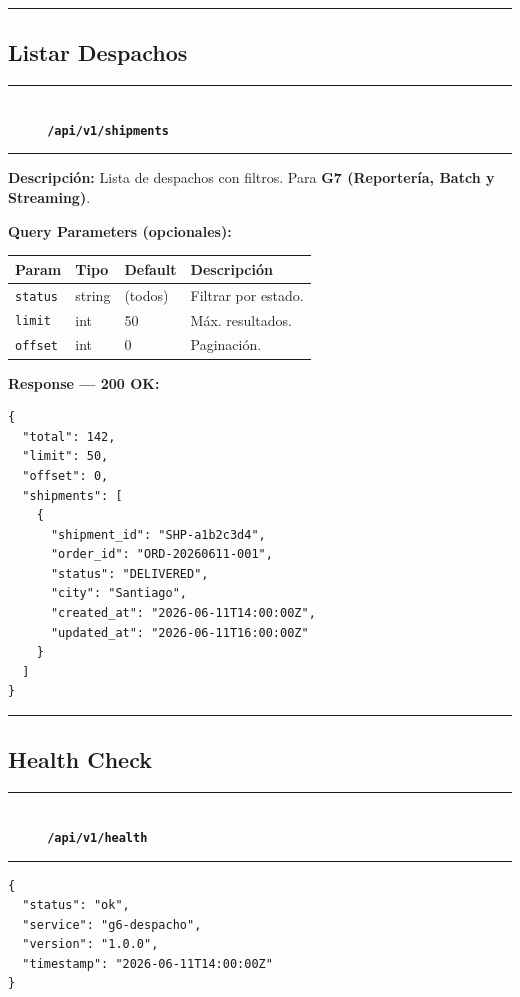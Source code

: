\documentclass[11pt, a4paper]{article}
\newcommand{\httpmethod}[2]{%
  \colorbox{#1}{\textcolor{white}{\textbf{\small\textsf{#2}}}}%
}
\newcommand{\routeheader}[3]{%
  \noindent\rule{\textwidth}{1.5pt}\\[0.3em]
  \httpmethod{#1}{#2}\;\texttt{\bfseries #3}\\[0.3em]
  \rule{\textwidth}{0.4pt}
  \vspace{0.3cm}
}
\begin{document}
\noindent\rule{\textwidth}{0.4pt}

\subsection{Listar Despachos}

\routeheader{get}{GET}{/api/v1/shipments}

\textbf{Descripción:} Lista de despachos con filtros. Para \textbf{G7 (Reportería, Batch y Streaming)}.

\vspace{0.3cm}
\textbf{Query Parameters (opcionales):}
\begin{table}[h!]
\small
\begin{tabularx}{\textwidth}{l l l X}
  \toprule
  \textbf{Param} & \textbf{Tipo} & \textbf{Default} & \textbf{Descripción} \\
  \midrule
  \texttt{status} & string & (todos) & Filtrar por estado. \\
  \texttt{limit}  & int    & 50      & Máx. resultados. \\
  \texttt{offset} & int    & 0       & Paginación. \\
  \bottomrule
\end{tabularx}
\end{table}

\textbf{Response --- 200 OK:}

\begin{lstlisting}
{
  "total": 142,
  "limit": 50,
  "offset": 0,
  "shipments": [
    {
      "shipment_id": "SHP-a1b2c3d4",
      "order_id": "ORD-20260611-001",
      "status": "DELIVERED",
      "city": "Santiago",
      "created_at": "2026-06-11T14:00:00Z",
      "updated_at": "2026-06-11T16:00:00Z"
    }
  ]
}
\end{lstlisting}

\noindent\rule{\textwidth}{0.4pt}

\subsection{Health Check}

\routeheader{get}{GET}{/api/v1/health}

\begin{lstlisting}
{
  "status": "ok",
  "service": "g6-despacho",
  "version": "1.0.0",
  "timestamp": "2026-06-11T14:00:00Z"
}
\end{lstlisting}
\end{document}
